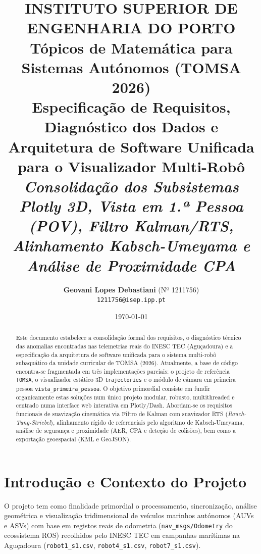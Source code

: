\documentclass[11pt,a4paper]{article}
\title{
    \vspace{-1.5cm}
    \textbf{INSTITUTO SUPERIOR DE ENGENHARIA DO PORTO}\\[0.2cm]
    \large Tópicos de Matemática para Sistemas Autónomos (TOMSA 2026)\\[0.6cm]
    \Large \textbf{Especificação de Requisitos, Diagnóstico dos Dados e Arquitetura de Software Unificada para o Visualizador Multi-Robô}\\[0.3cm]
    \large \textit{Consolidação dos Subsistemas Plotly 3D, Vista em 1.ª Pessoa (POV), Filtro Kalman/RTS, Alinhamento Kabsch-Umeyama e Análise de Proximidade CPA}
}
\author{
    \textbf{Geovani Lopes Debastiani} (Nº 1211756)\\
    \texttt{1211756@isep.ipp.pt}
}
\date{\today}
\begin{document}
\maketitle

\begin{abstract}
Este documento estabelece a consolidação formal dos requisitos, o diagnóstico técnico das anomalias encontradas nas telemetrias reais do INESC TEC (Aguçadoura) e a especificação da arquitetura de software unificada para o sistema multi-robô subaquático da unidade curricular de TOMSA (2026). Atualmente, a base de código encontra-se fragmentada em três implementações parciais: o projeto de referência \texttt{TOMSA}, o visualizador estático 3D \texttt{trajectories} e o módulo de câmara em primeira pessoa \texttt{vista\_primeira\_pessoa}. O objetivo primordial consiste em fundir organicamente estas soluções num único projeto modular, robusto, multithreaded e centrado numa interface web interativa em Plotly/Dash. Abordam-se os requisitos funcionais de suavização cinemática via Filtro de Kalman com suavizador RTS (\textit{Rauch-Tung-Striebel}), alinhamento rígido de referenciais pelo algoritmo de Kabsch-Umeyama, análise de segurança e proximidade (AER, CPA e deteção de colisões), bem como a exportação geoespacial (KML e GeoJSON).
\end{abstract}

\vspace{0.3cm}
\tableofcontents
\newpage

\section{Introdução e Contexto do Projeto}

O projeto tem como finalidade primordial o processamento, sincronização, análise geométrica e visualização tridimensional de veículos marinhos autónomos (AUVs e ASVs) com base em registos reais de odometria (\texttt{nav\_msgs/Odometry} do ecossistema ROS) recolhidos pelo INESC TEC em campanhas marítimas na Aguçadoura (\texttt{robot1\_s1.csv}, \texttt{robot4\_s1.csv}, \texttt{robot7\_s1.csv}).
\end{document}
